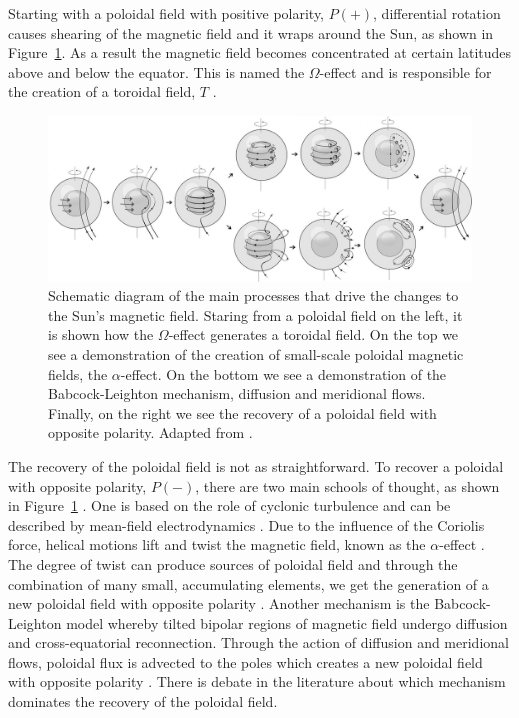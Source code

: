 Starting with a poloidal field with positive polarity, $P(+)$, differential rotation causes shearing of the magnetic field and it wraps around the Sun, as shown in Figure~\ref{fig:dynamo}. As a result the magnetic field becomes concentrated at certain latitudes above and below the equator. This is named the $\Omega$-effect and is responsible for the creation of a toroidal field, $T$ \citep{hathaway_solar_2015, charbonneau_dynamo_2020}.

\begin{figure}[ht!]
	\centering
	\includegraphics[width=0.95\columnwidth]{sun_dynamo.jpg}
	\caption{Schematic diagram of the main processes that drive the changes to the Sun's magnetic field. Staring from a poloidal field on the left, it is shown how the $\Omega$-effect generates a toroidal field. On the top we see a demonstration of the creation of small-scale poloidal magnetic fields, the $\alpha$-effect. On the bottom we see a demonstration of the Babcock-Leighton mechanism, diffusion and meridional flows. Finally, on the right we see the recovery of a poloidal field with opposite polarity. Adapted from \citet{sanchez_mean-field_2014}.}
	\label{fig:dynamo}
\end{figure}

The recovery of the poloidal field is not as straightforward. To recover a poloidal with opposite polarity, $P(-)$, there are two main schools of thought, as shown in Figure~\ref{fig:dynamo} \citep{sanchez_mean-field_2014}. One is based on the role of cyclonic turbulence and can be described by mean-field electrodynamics \citep{charbonneau_dynamo_2020}. Due to the influence of the Coriolis force, helical motions lift and twist the magnetic field, known as the $\alpha$-effect \citep{charbonneau_dynamo_2020}. The degree of twist can produce sources of poloidal field and through the combination of many small, accumulating elements, we get the generation of a new poloidal field with opposite polarity \citep{charbonneau_dynamo_2020}. Another mechanism is the Babcock-Leighton model \citep{babcock_topology_1961, leighton_transport_1964} whereby tilted bipolar regions of magnetic field undergo diffusion and cross-equatorial reconnection. Through the action of diffusion and meridional flows, poloidal flux is advected to the poles which creates a new poloidal field with opposite polarity \citep{sheeley_surface_2005, charbonneau_dynamo_2020}. There is debate in the literature about which mechanism dominates the recovery of the poloidal field.

